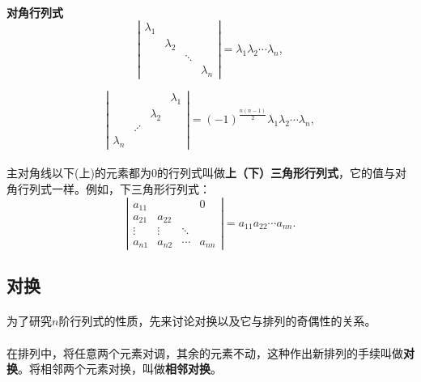 \paragraph{}
\textbf{对角行列式}
\begin{equation*}
  \left|\begin{array}{cccc}
    \lambda_1 & & & \\
    & \lambda_2 & & \\
    & & \ddots & \\
    & & & \lambda_n
  \end{array}\right| = \lambda_1\lambda_2\cdots \lambda_n,
\end{equation*}

\begin{equation*}
  \left|\begin{array}{cccc}
    & & & \lambda_1 \\
    & & \lambda_2 & \\
    & \iddots & & \\
    \lambda_n & & &
  \end{array}\right| = (-1)^{\frac{n(n-1)}{2}}\lambda_1\lambda_2\cdots \lambda_n,
\end{equation*}

\paragraph{}
主对角线以下(上)的元素都为$0$的行列式叫做\textbf{上（下）三角形行列式}，它的值与对角行列式一样。例如，下三角形行列式：
\begin{equation*}
  \left|\begin{array}{cccc}
    a_{11} & & & 0 \\
    a_{21} & a_{22} & & \\
    \vdots & \vdots & \ddots & \\
    a_{n1} & a_{n2} & \cdots & a_{nn}
  \end{array}\right| = a_{11}a_{22}\cdots a_{nn}.
\end{equation*}

\subsection{对换}
\paragraph{}
为了研究$n$阶行列式的性质，先来讨论对换以及它与排列的奇偶性的关系。

\paragraph{}
在排列中，将任意两个元素对调，其余的元素不动，这种作出新排列的手续叫做\textbf{对换}。将相邻两个元素对换，叫做\textbf{相邻对换}。

